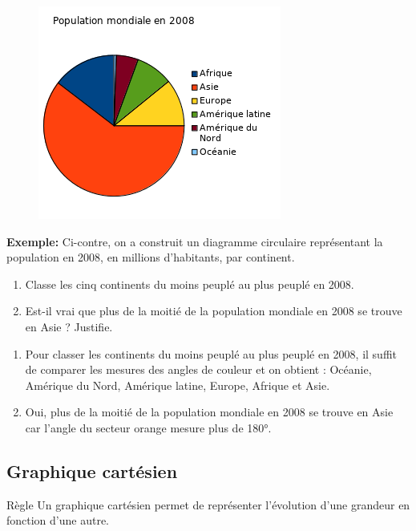 \documentclass[12pt,a4paper]{article}
\begin{document}
\begin{figure}
\vspace{-30pt}
  \begin{center}
	\includegraphics[scale=0.95]{img/diag-camb.png}
  \end{center}
\vspace{-40pt}
\end{figure}

\textbf{Exemple:} Ci-contre, on a construit un diagramme circulaire représentant la population en 2008, en millions d'habitants, par continent.

\begin{enumerate}[label=\textbf{\alph*.}]
\item Classe les cinq continents du moins peuplé au plus peuplé en 2008.
\item Est-il vrai que plus de la moitié de la population mondiale en 2008 se trouve en Asie ?
Justifie.
\end{enumerate}

\begin{enumerate}[label=\textbf{\alph*.}]
\item Pour classer les continents du moins peuplé au plus peuplé en 2008, il suffit de comparer les mesures des angles de couleur et on obtient :
Océanie, Amérique du Nord, Amérique latine, Europe, Afrique et Asie.
\item Oui, plus de la moitié de la population mondiale en 2008 se trouve en Asie car l'angle du secteur orange mesure plus de 180°.
\end{enumerate}

\subsection{Graphique cartésien}

\begin{definition}{Règle}
Un graphique cartésien permet de représenter l'évolution d'une grandeur en fonction d'une autre.
\end{definition}
\end{document}
